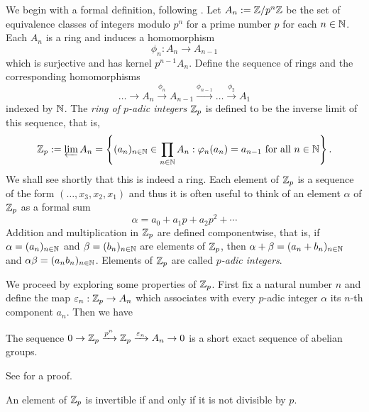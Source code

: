 We begin with a formal definition, following \cite{serre2012course}. Let \(A_n := \mathbb{Z}/p^n \mathbb{Z}\) be the set of equivalence classes of integers modulo \(p^n\) for a prime number \(p\) for each \(n \in \mathbb{N}\). Each \(A_n\) is a ring and induces a homomorphism\label{sec:padic-def}
\[
  \phi_n : A_{n} \to A_{n - 1}  
\]
which is surjective and has kernel \(p^{n-1}A_n\). Define the sequence of rings and the corresponding homomorphisms
\begin{equation*}
    \dots \to A_n \xrightarrow{\phi_n} A_{n - 1} \xrightarrow{\phi_{n - 1}} \dots \xrightarrow{\phi_2} A_1
\end{equation*}
indexed by \(\mathbb{N}\). The \emph{ring of \(p\)-adic integers} \(\mathbb{Z}_p\) is defined to be the inverse limit of this sequence, that is,
\[
  \mathbb{Z}_p := \varprojlim A_n = \left\{
    (a_n)_{n \in \mathbb{N}} \in \prod_{n \in \mathbb{N}} A_n : \varphi_n(a_n) = a_{n - 1} \text{ for all } n \in \mathbb{N}
  \right\}.
\]
We shall see shortly that this is indeed a ring. Each element of \(\mathbb{Z}_p\) is a sequence of the form \((\dots, x_3, x_2, x_1)\) and thus it is often useful to think of an element \(\alpha\) of \(\mathbb{Z}_p\) as a formal sum
\[
  \alpha = a_0 + a_1p + a_2p^2 + \cdots
\]
Addition and multiplication in \(\mathbb{Z}_p\) are defined componentwise, that is, if \(\alpha = (a_n)_{n \in \mathbb{N}}\) and \(\beta = (b_n)_{n \in \mathbb{N}}\) are elements of \(\mathbb{Z}_p\), then \(\alpha + \beta = (a_n + b_n)_{n \in \mathbb{N}}\) and \(\alpha\beta = (a_nb_n)_{n \in \mathbb{N}}\). Elements of \(\mathbb{Z}_p\) are called \emph{\(p\)-adic integers}.

We proceed by exploring some properties of \(\mathbb{Z}_p\). First fix a natural number \(n\) and define the map \(\varepsilon_n: \mathbb{Z}_p \to A_n\) which associates with every \(p\)-adic integer \(\alpha\) its \(n\)-th component \(a_n\). Then we have
\begin{theoremx}
    The sequence \(0 \to \mathbb{Z}_p \xrightarrow{p^n} \mathbb{Z}_p \xrightarrow{\varepsilon_n} A_n \to 0\) is a short exact sequence of abelian groups.
\end{theoremx}

See \cite[pp.~11--12]{serre2012course} for a proof.

\begin{theoremx}\label{thm:criterion-units-of-zp}
    An element of \(\mathbb{Z}_p\) is invertible if and only if it is not divisible by \(p\).
\end{theoremx}

